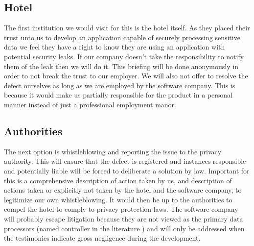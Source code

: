 \subsection*{Hotel}
The first institution we would visit for this is the hotel itself. As they placed their trust unto us to develop an application capable of securely processing sensitive data we feel they have a right to know they are using an application with potential security leaks. If our company doesn't take the responsibility to notify them of the leak then we will do it. This briefing will be done anonymously in order to not break the trust to our employer. We will also not offer to resolve the defect ourselves as long as we are employed by the software company. This is because it would make us partially responsible for the product in a personal manner instead of just a professional employment manor.

\subsection*{Authorities}
The next option is whistleblowing and reporting the issue to the privacy authority. This will ensure that the defect is registered and instances responsible and potentially liable will be forced to deliberate a solution by law. Important for this is a comprehensive description of action taken by us, and description of actions taken or explicitly not taken by the hotel and the software company, to legitimize our own whistleblowing. It would then be up to the authorities to compel the hotel to comply to privacy protection laws. The software company will probably escape litigation because they are not viewed as the primary data processors (named controller in the literature \cite{privacy_directive}) and will only be addressed when the testimonies indicate gross negligence during the development.

